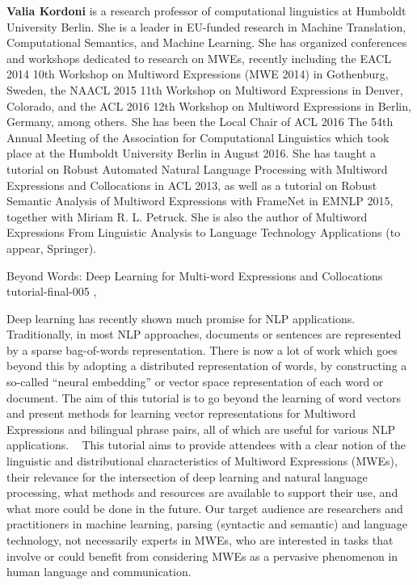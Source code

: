 \begin{bio}
  {\bfseries Valia Kordoni} is a research professor of computational linguistics at Humboldt University Berlin. She is a leader in EU-funded research in Machine Translation, Computational Semantics, and Machine Learning. She has organized conferences and workshops dedicated to research on MWEs, recently including the EACL 2014 10th Workshop on Multiword Expressions (MWE 2014) in Gothenburg, Sweden, the NAACL 2015 11th Workshop on Multiword Expressions in Denver, Colorado, and the ACL 2016 12th Workshop on Multiword Expressions in Berlin, Germany, among others. She has been the Local Chair of ACL 2016 The 54th Annual Meeting of the Association for Computational Linguistics which took place at the Humboldt University Berlin in August 2016. She has taught a tutorial on Robust Automated Natural Language Processing with Multiword Expressions and Collocations in ACL 2013, as well as a tutorial on Robust Semantic Analysis of Multiword Expressions with FrameNet in EMNLP 2015, together with Miriam R. L. Petruck. She is also the author of Multiword Expressions From Linguistic Analysis to Language Technology Applications (to appear, Springer).
\end{bio}

\begin{tutorial}
  {Beyond Words: Deep Learning for Multi-word Expressions and Collocations}
  {tutorial-final-005}
  {\daydateyear, \tutorialafternoontime}
  {\TutLocE}

Deep learning has recently shown much promise for NLP applications. Traditionally, in most NLP approaches, documents or sentences are represented by a sparse bag-of-words representation. There is now a lot of work which goes beyond this by adopting a distributed representation of words, by constructing a so-called ``neural embedding'' or vector space representation of each word or document. The aim of this tutorial is to go beyond the learning of word vectors and present methods for learning vector representations for Multiword Expressions and bilingual phrase pairs, all of which are useful for various NLP applications.
 
This tutorial aims to provide attendees with a clear notion of the linguistic and distributional characteristics of Multiword Expressions (MWEs), their relevance for the intersection of deep learning and natural language processing, what methods and resources are available to support their use, and what more could be done in the future. Our target audience are researchers and practitioners in machine learning, parsing (syntactic and semantic) and language technology, not necessarily experts in MWEs, who are interested in tasks that involve or could benefit from considering MWEs as a pervasive phenomenon in human language and communication.
\end{tutorial}
